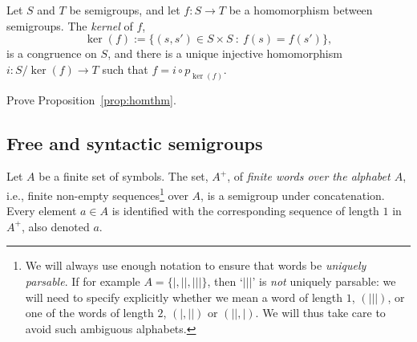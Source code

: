 \begin{proposition}\label{prop:homthm}
Let $S$ and $T$ be semigroups, and let $f \colon S \to T$ be a homomorphism between semigroups. The \emph{kernel} of $f$, 
\[ \ker(f) := \{(s,s') \in S \times S \ \colon \ f(s) = f(s') \},\]
is a congruence on $S$, and there is a unique injective homomorphism $i \colon S/{\ker(f)} \to T$ such that $f = i \circ p_{\ker(f)}$.
\end{proposition}
\begin{exercise}\medium
Prove Proposition~\ref{prop:homthm}.
\end{exercise}

\subsection*{Free and syntactic semigroups}
Let $A$ be a finite set of symbols. The set, $A^+$, of \emph{finite words over the alphabet $A$}, i.e., finite non-empty sequences\footnote{We will always use enough notation to ensure that words be \emph{uniquely parsable}. If for example $A = \{|, ||, |||\}$, then `$|||$' is \emph{not} uniquely parsable: we will need to specify explicitly whether we mean a word of length $1$, $(|||)$, or one of the words of length $2$, $(|,||)$ or $(||,|)$. We will thus take care to avoid such ambiguous alphabets.} over $A$, is a semigroup under concatenation. Every element $a \in A$ is identified with the corresponding sequence of length $1$ in $A^+$, also denoted $a$.

